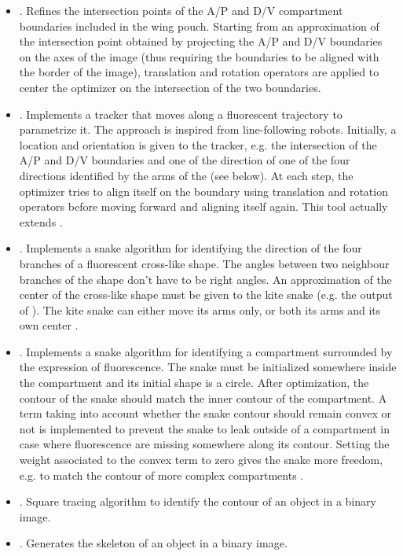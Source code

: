 \begin{itemize}
 \item \PlusShapeCenterDetector. Refines the intersection points of the A/P and D/V compartment boundaries included in the \droso wing pouch. Starting from an approximation of the intersection point obtained by projecting the A/P and D/V boundaries on the axes of the image (thus requiring the boundaries to be aligned with the border of the image), translation and rotation operators are applied to center the optimizer on the intersection of the two boundaries.
 \item \FluorescenceTrajectoryTracker. Implements a tracker that moves along a fluorescent trajectory to parametrize it. The approach is inspired from line-following robots. Initially, a location and orientation is given to the tracker, e.g. the intersection of the A/P and D/V boundaries and one of the direction of one of the four directions identified by the arms of the \KiteSnake (see below). At each step, the optimizer tries to align itself on the boundary using translation and rotation operators before moving forward and aligning itself again. This tool actually extends \PlusShapeCenterDetector.
 \item \KiteSnake. Implements a snake algorithm for identifying the direction of the four branches of a fluorescent cross-like shape. The angles between two neighbour branches of the shape don't have to be right angles. An approximation of the center of the cross-like shape must be given to the kite snake (e.g. the output of \PlusShapeCenterDetector). The kite snake can either move its arms only, or both its arms and its own center \autocite{schaffter2013}.
 \item \CompartmentSnake. Implements a snake algorithm for identifying a compartment surrounded by the expression of fluorescence. The snake must be initialized somewhere inside the compartment and its initial shape is a circle. After optimization, the contour of the snake should match the inner contour of the compartment. A term taking into account whether the snake contour should remain convex or not is implemented to prevent the snake to leak outside of a compartment in case where fluorescence are missing somewhere along its contour. Setting the weight associated to the convex term to zero gives the snake more freedom, e.g. to match the contour of more complex compartments \autocite{schaffter2013}.
 \item \ContourTracer. Square tracing algorithm to identify the contour of an object in a binary image.
 \item \Skeleton. Generates the skeleton of an object in a binary image.
\end{itemize}